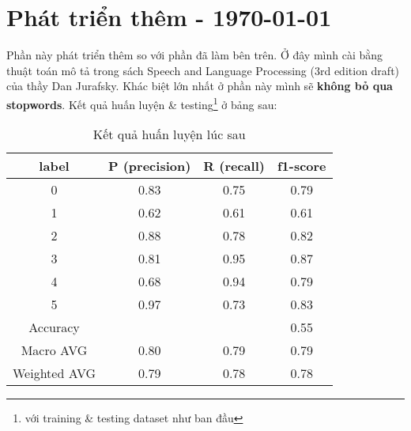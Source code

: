 \documentclass[12pt]{article}
\begin{document}
\section{Phát triển thêm - \today}
Phần này phát triển thêm so với phần đã làm bên trên. Ở đây mình cài bằng thuật toán mô tả trong sách Speech and Language Processing (3rd edition draft) của thầy Dan Jurafsky\cite{10.5555/555733}. Khác biệt lớn nhất ở phần này mình sẽ \textbf{không bỏ qua stopwords}. Kết quả huấn luyện \& testing\footnote{với training \& testing dataset như ban đầu} ở bảng sau:
\begin{table}[H]
\centering
\begin{tabular}{|c|c|c|c|}
\hline
label & P (precision) & R (recall) & f1-score \\
\hline
0 & 0.83 & 0.75 & 0.79 \\
1 & 0.62 & 0.61 & 0.61 \\
2 & 0.88 & 0.78 & 0.82 \\
3 & 0.81 & 0.95 & 0.87 \\
4 & 0.68 & 0.94 & 0.79 \\
5 & 0.97 & 0.73 & 0.83 \\
\hline
Accuracy &  &  & 0.55 \\
Macro AVG & 0.80 & 0.79 & 0.79 \\
Weighted AVG & 0.79 & 0.78 & 0.78 \\
\hline
\end{tabular}
\caption{Kết quả huấn luyện lúc sau}
\end{table}



\cleardoublepage
{}
{}


\end{document}
